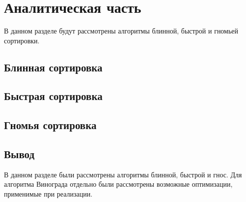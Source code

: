 \chapter{Аналитическая часть}

В данном разделе будут рассмотрены алгоритмы блинной, быстрой и гномьей сортировки.

\section{Блинная сортировка}
\section{Быстрая сортировка}
\section{Гномья сортировка}

\section*{Вывод}

В данном разделе были рассмотрены алгоритмы блинной, быстрой и гнос.
Для алгоритма Винограда отдельно были рассмотрены возможные оптимизации, применимые при реализации.